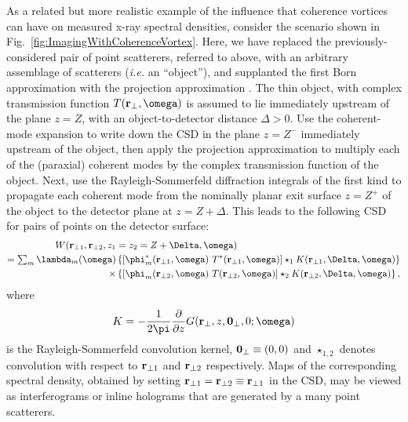 \documentclass{iucr}              %
\newcommand{\inblue}[1]{{\color{blue}#1}}
\begin{document}
As a related but more realistic example of the  influence that coherence vortices can have on measured x-ray spectral densities, consider the scenario shown in \inblue{Fig.~\ref{fig:ImagingWithCoherenceVortex}}.  Here, we have replaced the previously-considered pair of point scatterers, referred to above, with an arbitrary assemblage of scatterers ({\em i.e.} an ``object''), and supplanted the first Born approximation with the projection approximation \cite{paganin_book}.  The thin object, with complex transmission function $T({\bf r}_{\perp},\omega)$ is assumed to lie immediately upstream of the plane $z=Z$, with an object-to-detector distance $\Delta > 0$.  Use the coherent-mode expansion to write down the CSD in the plane $z=Z^-$ immediately upstream of the object, then apply the projection approximation to multiply each of the (paraxial) coherent modes by the complex transmission function of the object.  Next, use the Rayleigh-Sommerfeld diffraction integrals of the first kind \cite{Rayleigh, Sommerfeld, mandel_wolf} to propagate each coherent mode from the nominally planar exit surface $z=Z^+$ of the object to the detector plane at $z=Z+\Delta$.  This leads to the following CSD for pairs of points on the detector surface:     
\begin{equation}
\begin{aligned}
\label{eq:CSD_with_object_and_detector}
W ({\bf r}_{\perp 1}, {\bf r}_{\perp 2},z_1 &=z_2=Z+\Delta,\omega) \\ =\sum_m \lambda_m({\omega}) & \left\{ [\phi_m^*({\bf r}_{\perp 1},\omega)~T^*({\bf r}_{\perp 1},\omega)]\star_1 K({\bf r}_{\perp 1},\Delta,\omega)\right\} \\ \times & \left\{ [\phi_m({\bf r}_{\perp 2},\omega)~T({\bf r}_{\perp 2},\omega)]\star_2 K({\bf r}_{\perp 2},\Delta,\omega)\right\},
\end{aligned}
\end{equation}
where 
\begin{equation}
K=-\frac{1}{2\pi} \frac{\partial}{\partial z} G({\bf r}_{\perp},z,{\bf 0}_{\perp},0;\omega) 
\end{equation}
is the Rayleigh-Sommerfeld convolution kernel, ${\bf 0}_{\perp}\equiv (0,0)$ and $\star_{1,2}$ denotes convolution with respect to ${\bf r}_{\perp 1}$ and ${\bf r}_{\perp 2}$ respectively.  Maps of the corresponding spectral density, obtained by setting ${\bf r}_{\perp 1}={\bf r}_{\perp 2}\equiv{\bf r}_{\perp 1}$ in the CSD, may be viewed as interferograms or inline holograms that are generated by a many point scatterers.   
\end{document}
